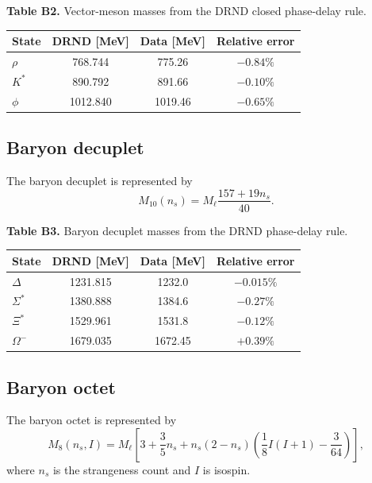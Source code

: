 \documentclass[12pt]{iopart}
\begin{document}
\noindent\textbf{Table B2.} Vector-meson masses from the DRND closed phase-delay rule.

\begin{center}
\small
\begin{tabular}{lccc}
\hline
\textbf{State} & \textbf{DRND [MeV]} & \textbf{Data [MeV]} & \textbf{Relative error} \\
\hline
\(\rho\)   & 768.744  & 775.26  & \(-0.84\%\) \\
\(K^\ast\) & 890.792  & 891.66  & \(-0.10\%\) \\
\(\phi\)   & 1012.840 & 1019.46 & \(-0.65\%\) \\
\hline
\end{tabular}
\end{center}

\subsection{Baryon decuplet}

The baryon decuplet is represented by
\begin{equation}
M_{10}(n_s)
=
M_\ell
\frac{157+19n_s}{40}.
\label{eq:baryon_decuplet}
\end{equation}

\noindent\textbf{Table B3.} Baryon decuplet masses from the DRND phase-delay rule.

\begin{center}
\small
\begin{tabular}{lccc}
\hline
\textbf{State} & \textbf{DRND [MeV]} & \textbf{Data [MeV]} & \textbf{Relative error} \\
\hline
\(\Delta\)      & 1231.815 & 1232.0  & \(-0.015\%\) \\
\(\Sigma^\ast\) & 1380.888 & 1384.6  & \(-0.27\%\) \\
\(\Xi^\ast\)    & 1529.961 & 1531.8  & \(-0.12\%\) \\
\(\Omega^-\)    & 1679.035 & 1672.45 & \(+0.39\%\) \\
\hline
\end{tabular}
\end{center}

\subsection{Baryon octet}

The baryon octet is represented by
\begin{equation}
M_8(n_s,I)
=
M_\ell
\left[
3+\frac{3}{5}n_s
+
n_s(2-n_s)
\left(
\frac18 I(I+1)-\frac{3}{64}
\right)
\right],
\label{eq:baryon_octet}
\end{equation}
where \(n_s\) is the strangeness count and \(I\) is isospin.
\end{document}
